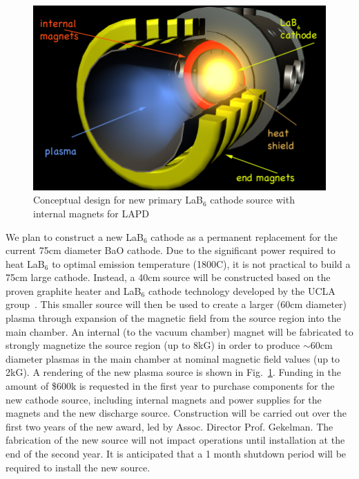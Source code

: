 \documentclass[11pt]{article}
\renewcommand{\cite}{\citep}
\begin{document}
\begin{figure}
\begin{center}
\includegraphics[width=3.5truein]{lab6-proposal}
\caption{Conceptual design for new primary LaB$_6$ cathode source with
  internal magnets for LAPD}\label{newcath}
\end{center}
\end{figure}

We plan to construct a new LaB$_6$ cathode as a permanent replacement
for the current 75cm diameter BaO cathode.  Due to the significant power
required to heat LaB$_6$ to optimal emission temperature (1800C), it
is not practical to build a 75cm large cathode.  Instead, a 40cm source will
be constructed based on the proven graphite heater and LaB$_6$ cathode
technology developed by the UCLA group~\cite{cooper:2010}.  This smaller source will then
be used to create a larger (60cm diameter) plasma through expansion of
the magnetic field from the source region into the main chamber.  An
internal (to the vacuum chamber) magnet will be fabricated to strongly
magnetize the source region (up to 8kG) in order to produce $\sim
60$cm diameter plasmas in the main chamber at nominal magnetic field
values (up to 2kG).  A rendering of the new plasma source is shown in
Fig.~\ref{newcath}.  Funding in the amount of \$600k is
requested in the first year to purchase components for the new
cathode source, including internal magnets and power supplies for the
magnets and the new discharge source.  Construction  will be carried
out over the first two years of the new award, led by Assoc. Director
Prof. Gekelman.  The fabrication of the new source will not impact
operations until installation at the end of the second year.  It is
anticipated that a 1 month shutdown period will be required to install
the new source.  
\end{document}
